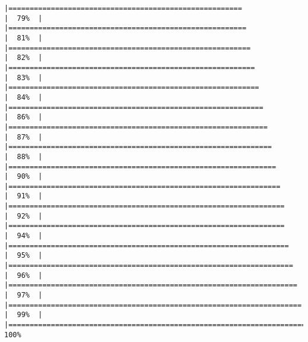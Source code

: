 \documentclass[
]{article}
\begin{document}
\begin{verbatim}
|=======================================================               |  79%  |                                                                              |========================================================              |  81%  |                                                                              |=========================================================             |  82%  |                                                                              |==========================================================            |  83%  |                                                                              |===========================================================           |  84%  |                                                                              |============================================================          |  86%  |                                                                              |=============================================================         |  87%  |                                                                              |==============================================================        |  88%  |                                                                              |===============================================================       |  90%  |                                                                              |================================================================      |  91%  |                                                                              |=================================================================     |  92%  |                                                                              |=================================================================     |  94%  |                                                                              |==================================================================    |  95%  |                                                                              |===================================================================   |  96%  |                                                                              |====================================================================  |  97%  |                                                                              |===================================================================== |  99%  |                                                                              |======================================================================| 100%
\end{verbatim}
\end{document}
